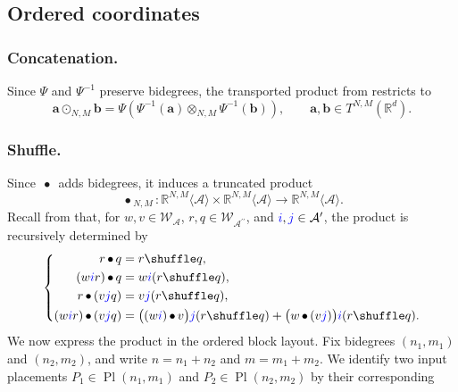 \documentclass{amsart}
\theoremstyle{definition}
\theoremstyle{remark}
\newcommand{\gammashuffle}{{\,\bullet\,}}
\newcommand{\blue}[1]{{\color{blue}#1}}
\begin{document}
\subsection{Ordered coordinates}


\subsubsection{Concatenation.}\label{sec:shear_concat}
Since $\Psi$ and $\Psi^{-1}$ preserve bidegrees, the transported product
from  restricts to
\[
    \mathbf{a}\odot_{N,M}\mathbf{b}
    =
    \Psi
    \left(
        \Psi^{-1}(\mathbf{a})
        \otimes_{N,M}
        \Psi^{-1}(\mathbf{b})
    \right),
    \qquad
    \mathbf{a},\mathbf{b}
    \in
    T^{N,M}(\mathbb{R}^d).
\]


\subsubsection{Shuffle.}
Since $\gammashuffle$ adds bidegrees, it induces a truncated product
\[
    \gammashuffle_{N,M}
    :
    \mathbb{R}^{N,M}\langle\mathcal{A}\rangle
    \times
    \mathbb{R}^{N,M}\langle\mathcal{A}\rangle
    \longrightarrow
    \mathbb{R}^{N,M}\langle\mathcal{A}\rangle.
\]
Recall from \cite[Proposition~3.7]{mainpaper} that, for
$w,v\in\mathcal{W}_{\mathcal{A}}$,
$r,q\in\mathcal{W}_{\mathcal{A}^{\prime\prime}}$, and
$\blue{i},\blue{j}\in\mathcal{A}^{\prime}$, the product is recursively
determined by
\begin{equation}
\label{eq:gamma_shuf_recursion}
\left\{
\begin{aligned}
    r\gammashuffle q
    &=
    r\shuffle q,
    \\
    (w\blue{i}r)\gammashuffle q
    &=
    w\blue{i}(r\shuffle q),
    \\
    r\gammashuffle(v\blue{j}q)
    &=
    v\blue{j}(r\shuffle q),
    \\
    (w\blue{i}r)\gammashuffle(v\blue{j}q)
    &=
    \bigl(
        (w\blue{i})\gammashuffle v
    \bigr)
    \blue{j}(r\shuffle q)
    +
    \bigl(
        w\gammashuffle(v\blue{j})
    \bigr)
    \blue{i}(r\shuffle q).
\end{aligned}
\right.
\end{equation}
We now express the product in the ordered block layout. Fix bidegrees
$(n_1,m_1)$ and $(n_2,m_2)$, and write $n=n_1+n_2$ and
$m=m_1+m_2$. We identify two input placements
$P_1\in\operatorname{Pl}(n_1,m_1)$ and
$P_2\in\operatorname{Pl}(n_2,m_2)$ by their corresponding
\end{document}
